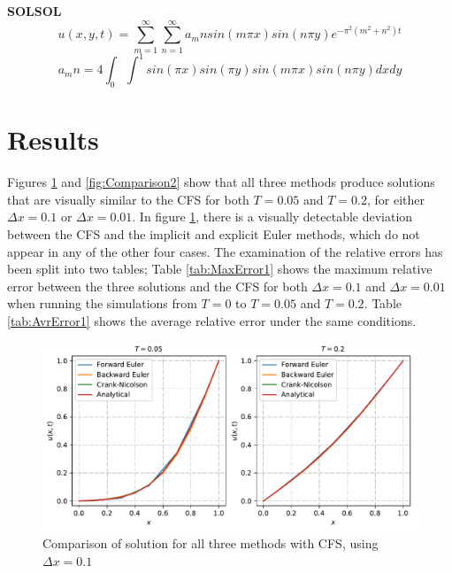 \documentclass[%
oneside,                 %
final,                   %
10pt]{article}
\begin{document}
\textbf{SOLSOL}
\begin{equation}
u(x,y,t)=\sum_{m=1}^{\infty} \sum_{n=1}^{\infty} a_mn sin (m\pi x) sin (n \pi y) e^{-\pi^2(m^2+n^2)t}
\end{equation}
\begin{equation}
a_mn=4\int_0 \int^1 sin (\pi x)  sin (\pi y) sin (m\pi x)  sin (n \pi y) dx dy
\end{equation}


\section{Results}
Figures \ref{fig:Comparison1} and \ref{fig:Comparison2} show that all three methods produce solutions that are visually similar to the CFS for both $T=0.05$ and $T=0.2$, for either $\Delta x =0.1$ or $\Delta x =0.01$. In figure \ref{fig:Comparison1}, there is a visually detectable deviation between the CFS and the implicit and explicit Euler methods, which do not appear in any of the other four cases. \newline
The examination of the relative errors has been split into two tables; Table \ref{tab:MaxError1} shows the maximum relative error between the three solutions and the CFS for both $\Delta x=0.1$ and $\Delta x=0.01$ when running the simulations from $T=0$ to $T=0.05$ and $T=0.2$. Table \ref{tab:AvrError1} shows the average relative error under the same conditions.



\begin{figure}[!htb]
        \centering 
         \includegraphics[scale=.6]{../Results/Comparison_1.pdf} 
        \caption{Comparison of solution for all three methods with CFS,  using $\Delta x=0.1$}
        \label{fig:Comparison1}   
\end{figure}  
\end{document}
